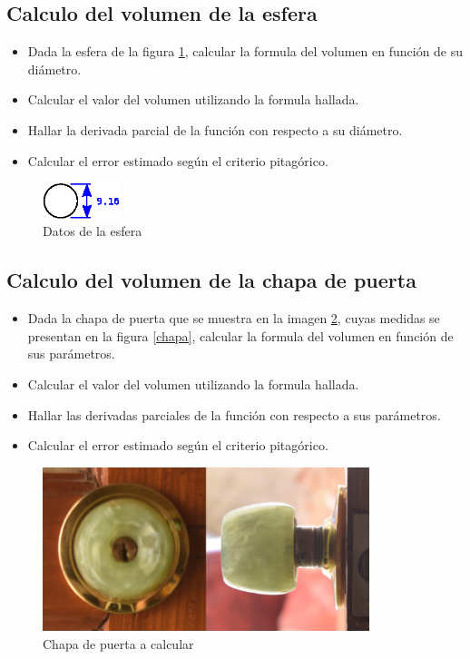 \documentclass[letter,11pt]{article}
\begin{document}
\subsection{Calculo del volumen de la esfera}
\begin{itemize}
\item Dada la esfera de la figura \ref{esfera}, calcular la formula del
volumen en función de su diámetro.
\item Calcular el valor del volumen utilizando la formula hallada.
\item Hallar la derivada parcial de la función con respecto a su diámetro.
\item Calcular el error estimado según el criterio pitagórico.
\end{itemize}

\begin{figure}
\centering
\includegraphics[width=0.20\textwidth]{eps/02_07.esfera.eps}
\caption{Datos de la esfera}
\label{esfera}
\end{figure}

\subsection{Calculo del volumen de la chapa de puerta}
\begin{itemize}
\item Dada la chapa de puerta que se muestra en la imagen \ref{fotografia},
cuyas medidas se presentan en la figura \ref{chapa}, calcular la formula del
volumen en función de sus parámetros.
\item Calcular el valor del volumen utilizando la formula hallada.
\item Hallar las derivadas parciales de la función con respecto a sus
parámetros.
\item Calcular el error estimado según el criterio pitagórico.
\end{itemize}

\begin{figure}
\centering
\includegraphics[width=0.85\textwidth]{eps/02.chapa.eps}
\caption{Chapa de puerta a calcular}
\label{fotografia}
\end{figure}
\end{document}
